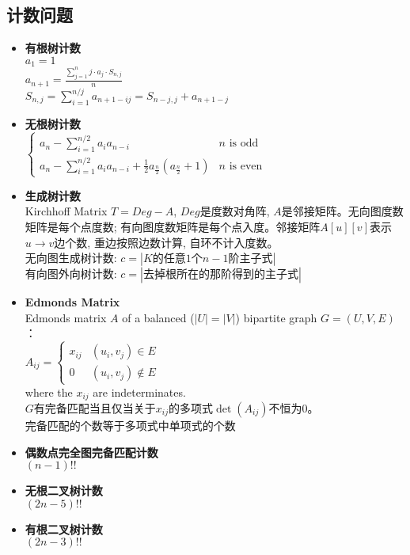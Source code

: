 	\subsection*{计数问题}
		\begin{itemize}
			\item \textbf{有根树计数}
				\\$ a_1 = 1 $
				\\$ a_{n + 1} = \frac{\sum\limits_{j = 1}^{n} j \cdot a_j \cdot S_{n, j}}{n} $
				\\$ S_{n, j} = \sum\limits_{i = 1}^{n / j} a_{n + 1 - ij} = S_{n - j, j} + a_{n + 1 - j} $
			\item \textbf{无根树计数}
				\\$ \begin{cases}
					a_n - \sum\limits_{i = 1}^{n / 2} a_i a_{n - i} & n \text{ is odd}\\
					a_n - \sum\limits_{i = 1}^{n / 2} a_i a_{n - i} + \frac{1}{2} a_{\frac{n}{2}} (a_{\frac{n}{2}} + 1) & n \text{ is even}
				\end{cases} $
			\item \textbf{生成树计数}
				\\Kirchhoff Matrix $ T = Deg − A $, $ Deg $是度数对角阵, $ A $是邻接矩阵。无向图度数矩阵是每个点度数; 有向图度数矩阵是每个点入度。邻接矩阵$ A[u][v] $表示$ u \to v $边个数, 重边按照边数计算, 自环不计入度数。
				\\无向图生成树计数: $ c = \left|K\text{的任意}1\text{个}n−1\text{阶主子式}\right| $
				\\有向图外向树计数: $ c = \left|\text{去掉根所在的那阶得到的主子式}\right| $
			\item \textbf{Edmonds Matrix}
				\\Edmonds matrix $ A $ of a balanced ($ \left| U \right| = \left| V \right| $) bipartite graph $ G = (U, V, E) $：
				\\$ A_{ij} = \begin{cases}
					x_{ij} & (u_i, v_j) \in E\\
					0 & (u_i, v_j) \notin E
				\end{cases} $
				\\where the $ x_{ij} $ are indeterminates.
				\\$ G $有完备匹配当且仅当关于$ x_{ij} $的多项式$ \det(A_{ij}) $不恒为$ 0 $。
				\\完备匹配的个数等于多项式中单项式的个数
			\item \textbf{偶数点完全图完备匹配计数}
				\\$ (n - 1)!! $
			\item \textbf{无根二叉树计数}
				\\$ (2n - 5)!! $
			\item \textbf{有根二叉树计数}
				\\$ (2n - 3)!! $
		\end{itemize}
